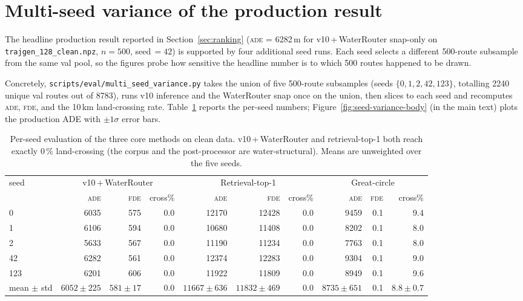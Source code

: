 \documentclass[11pt,a4paper]{article}
\newcommand{\ade}{\textsc{ade}}
\newcommand{\fde}{\textsc{fde}}
\begin{document}
\section{Multi-seed variance of the production result}
\label{app:variance}

The headline production result reported in Section~\ref{sec:ranking}
(\ade{} = 6282\,m for v10\,+\,WaterRouter snap-only on
\texttt{trajgen\_128\_clean.npz}, $n{=}500$, seed\,$=42$) is supported by
four additional seed runs.  Each seed selects a different 500-route
subsample from the same val pool, so the figures probe how sensitive the
headline number is to which 500 routes happened to be drawn.

Concretely, \texttt{scripts/eval/multi\_seed\_variance.py} takes the union of
five 500-route subsamples (seeds $\{0, 1, 2, 42, 123\}$, totalling 2240
unique val routes out of 8783), runs v10 inference and the WaterRouter snap
once on the union, then slices to each seed and recomputes \ade{},
\fde{}, and the 10\,km land-crossing rate.
Table~\ref{tab:variance} reports the per-seed numbers;
Figure~\ref{fig:seed-variance-body} (in the main text) plots the production
ADE with $\pm 1\sigma$ error bars.

\begin{table}[ht]
\centering
\caption{Per-seed evaluation of the three core methods on clean data.
         v10\,+\,WaterRouter and retrieval-top-1 both reach exactly 0\,\%
         land-crossing (the corpus and the post-processor are
         water-structural).  Means are unweighted over the five seeds.}
\label{tab:variance}
\small
\begin{tabular}{lrrr|rrr|rrr}
\toprule
seed & \multicolumn{3}{c}{v10\,+\,WaterRouter} & \multicolumn{3}{c}{Retrieval-top-1} & \multicolumn{3}{c}{Great-circle} \\
     & \ade{} & \fde{} & cross\% & \ade{} & \fde{} & cross\% & \ade{} & \fde{} & cross\% \\
\midrule
  0  &  6035 &  575 & 0.0 & 12170 & 12428 & 0.0 &  9459 & 0.1 &  9.4 \\
  1  &  6106 &  594 & 0.0 & 10680 & 11408 & 0.0 &  8202 & 0.1 &  8.0 \\
  2  &  5633 &  567 & 0.0 & 11190 & 11234 & 0.0 &  7763 & 0.1 &  8.0 \\
 42  &  6282 &  561 & 0.0 & 12374 & 12283 & 0.0 &  9304 & 0.1 &  9.0 \\
123  &  6201 &  606 & 0.0 & 11922 & 11809 & 0.0 &  8949 & 0.1 &  9.6 \\
\midrule
mean $\pm$ std & $6052 \pm 225$ & $581 \pm 17$ & 0.0 & $11667 \pm 636$ & $11832 \pm 469$ & 0.0 & $8735 \pm 651$ & 0.1 & $8.8 \pm 0.7$ \\
\bottomrule
\end{tabular}
\end{table}
\end{document}
